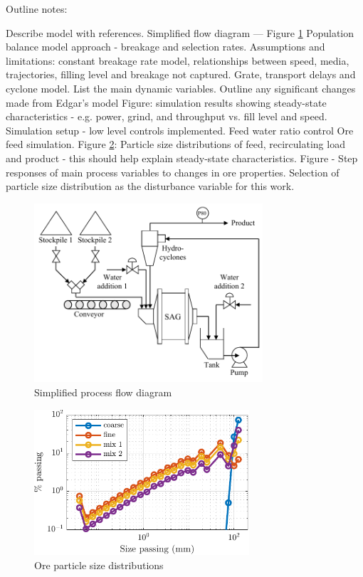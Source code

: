 Outline notes:
\begin{outline}
	\1 Describe model with references.
	\1 Simplified flow diagram — Figure \ref{fig:sag-diag}
	\1 Population balance model approach - breakage and selection rates.
    \1 Assumptions and limitations: constant breakage rate model, relationships between speed, media, trajectories,  filling level and breakage not captured.
	\1 Grate, transport delays and cyclone model.
	\1 List the main dynamic variables.
	\1 Outline any significant changes made from Edgar's model
	\1 Figure: simulation results showing steady-state characteristics - e.g. power, grind, and throughput vs. fill level and speed.
	\1 Simulation setup - low level controls implemented.
	\2 Feed water ratio control
	\2 Ore feed simulation.
	\1 Figure \ref{fig:coarse_fine_psd_plot}: Particle size distributions of feed, recirculating load and product - this should help explain steady-state characteristics.
	\1 Figure - Step responses of main process variables to changes in ore properties.
	\1 Selection of particle size distribution as the disturbance variable for this work.
\end{outline}



\begin{figure}[htp]
	\centering
	\includegraphics[width=8.5cm]{images/sag-circuit-diag.pdf}
	\caption{Simplified process flow diagram}
	\label{fig:sag-diag}
\end{figure}

\begin{figure}[htp]
	\centering
	\includegraphics[width=8cm]{images/coarse_fine_psd_plot.pdf}
	\caption{Ore particle size distributions}
	\label{fig:coarse_fine_psd_plot}
\end{figure}

